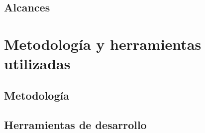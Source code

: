 \subsection{Alcances}
\begin{comment}
En el año 1993 se creó mediante Resolución 1662 la Prosecución de Estudios conducentes al título de Ingeniero Civil Informático, modalidad vespertina. Este programa de formación está dirigido a profesionales titulados de carreras de Ingeniería de Ejecución del área.

Adicionalmente, un proyecto de equipamiento mayor permitió la compra de un Super-Computador Silicon Graphics para procesamiento paralelo, único en ese momento en el país. Aparece entonces la necesidad de crear tres laboratorios de investigación en las áreas de Procesamiento Paralelo y Optimización, Sistemas Colaborativos y Robótica. La creación de estos laboratorios y la creciente implicación de alumnos como ayudantes de investigación, permitieron abordar proyectos señeros de Asistencia Técnica, como la elaboración de un manual de entrenamiento para el avión Pillán de la Fuerza Aérea de Chile, basado en tecnologías de realidad virtual.
\end{comment}


\section{Metodolog\'ia y herramientas utilizadas}
\label{intro:metodologia}

\subsection{Metodolog\'ia}
\begin{comment}
Se creó el primer programa de titulación especial para ex-alumnos y la carrera de Ingeniería de Ejecución en Computación e Informática modalidad vespertina.
\end{comment}


\subsection{Herramientas de desarrollo}
\begin{comment}
El Departamento comenzó a potenciar sus actividades de investigación mediante la creación del Magíster en Ingeniería Informática (Resolución 386 de 1994), y la implantación de un plan de perfeccionamiento para los académicos conducente a la obtención del grado de Doctor. El plan además consideraba la contratación de nuevos académicos con dicho grado. Es así, como a finales de los 90, el Departamento contaba con nueve doctores jornada completa y otros dos en perfeccionamiento.
\end{comment}



